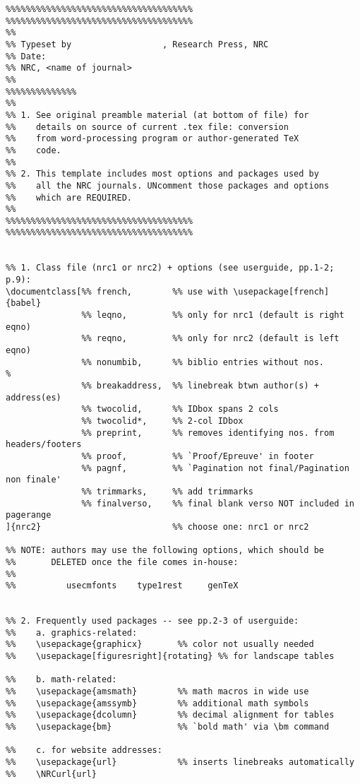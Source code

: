 \begin{verbatim}
%%%%%%%%%%%%%%%%%%%%%%%%%%%%%%%%%%%%%
%%%%%%%%%%%%%%%%%%%%%%%%%%%%%%%%%%%%%
%%
%% Typeset by                  , Research Press, NRC
%% Date: 
%% NRC, <name of journal>
%% 
%%%%%%%%%%%%%%
%%
%% 1. See original preamble material (at bottom of file) for
%%    details on source of current .tex file: conversion
%%    from word-processing program or author-generated TeX
%%    code. 
%%
%% 2. This template includes most options and packages used by 
%%    all the NRC journals. UNcomment those packages and options
%%    which are REQUIRED. 
%% 
%%%%%%%%%%%%%%%%%%%%%%%%%%%%%%%%%%%%%
%%%%%%%%%%%%%%%%%%%%%%%%%%%%%%%%%%%%%


%% 1. Class file (nrc1 or nrc2) + options (see userguide, pp.1-2; p.9):
\documentclass[%% french,        %% use with \usepackage[french]{babel}
               %% leqno,         %% only for nrc1 (default is right eqno)
               %% reqno,         %% only for nrc2 (default is left eqno)
               %% nonumbib,      %% biblio entries without nos.
%
               %% breakaddress,  %% linebreak btwn author(s) + address(es)
               %% twocolid,      %% IDbox spans 2 cols
               %% twocolid*,     %% 2-col IDbox
               %% preprint,      %% removes identifying nos. from headers/footers
               %% proof,         %% `Proof/Epreuve' in footer
               %% pagnf,         %% `Pagination not final/Pagination non finale'
               %% trimmarks,     %% add trimmarks
               %% finalverso,    %% final blank verso NOT included in pagerange
]{nrc2}                          %% choose one: nrc1 or nrc2

%% NOTE: authors may use the following options, which should be
%%       DELETED once the file comes in-house:
%%      
%%          usecmfonts    type1rest     genTeX


%% 2. Frequently used packages -- see pp.2-3 of userguide: 
%%    a. graphics-related:
%%    \usepackage{graphicx}       %% color not usually needed
%%    \usepackage[figuresright]{rotating} %% for landscape tables

%%    b. math-related: 
%%    \usepackage{amsmath}        %% math macros in wide use
%%    \usepackage{amssymb}        %% additional math symbols
%%    \usepackage{dcolumn}        %% decimal alignment for tables
%%    \usepackage{bm}             %% `bold math' via \bm command

%%    c. for website addresses:
%%    \usepackage{url}            %% inserts linebreaks automatically
%%    \NRCurl{url}


\end{verbatim}
